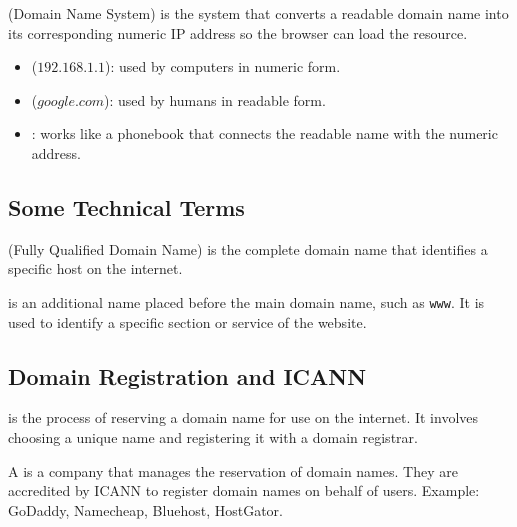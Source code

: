\begin{definitionbox}[DNS]
     (Domain Name System) is the system that converts a readable domain name into its corresponding numeric IP address so the browser can load the resource.
\end{definitionbox}

\begin{summarybox}
    \begin{itemize}
        \item {} ($192.168.1.1$): used by computers in numeric form.
        \item {} ($google.com$): used by humans in readable form.
        \item {}: works like a phonebook that connects the readable name with the numeric address.
    \end{itemize}
\end{summarybox}

\subsection{Some Technical Terms}

\begin{definitionbox}[FQDN]
     (Fully Qualified Domain Name) is the complete domain name that identifies a specific host on the internet.
\end{definitionbox}

\begin{definitionbox}[Subdomain]
     is an additional name placed before the main domain name, such as \texttt{www}. It is used to identify a specific section or service of the website.
\end{definitionbox}

\subsection{Domain Registration and ICANN}

\begin{definitionbox}
     is the process of reserving a domain name for use on the internet. It involves choosing a unique name and registering it with a domain registrar.
\end{definitionbox}

\begin{definitionbox}
    A  is a company that manages the reservation of domain names. They are accredited by ICANN to register domain names on behalf of users. Example: GoDaddy, Namecheap, Bluehost, HostGator.
\end{definitionbox}

